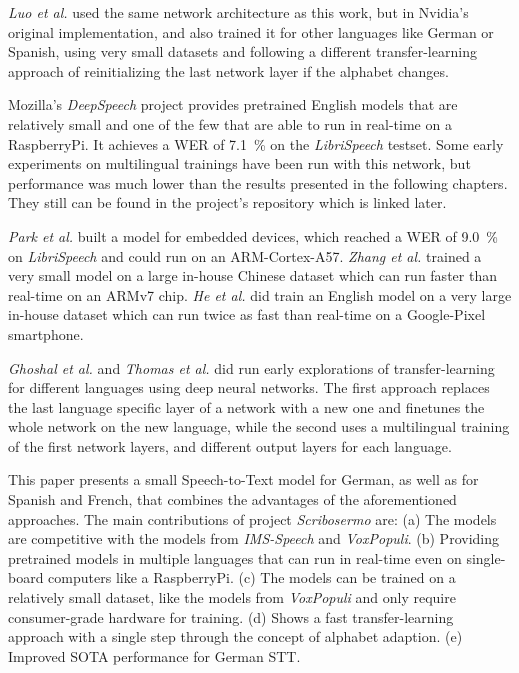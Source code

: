 \documentclass[a4paper]{article}
\begin{document}
\textit{Luo et al.} \cite{QNTECR} used the same network architecture as this work, but in Nvidia's original implementation, and also trained it for other languages like German or Spanish, using very small datasets and following a different transfer-learning approach of reinitializing the last network layer if the alphabet changes. 

Mozilla's \textit{DeepSpeech} project \cite{DEPSPE} provides pretrained English models that are relatively small and one of the few that are able to run in real-time on a RaspberryPi. It achieves a WER of \SI{7.1}{\percent} on the \textit{LibriSpeech} \cite{LIBSPE} testset. Some early experiments on multilingual trainings have been run with this network, but performance was much lower than the results presented in the following chapters. They still can be found in the project's repository which is linked later.

\textit{Park et al.} \cite{FNNMED} built a model for embedded devices, which reached a WER of \SI{9.0}{\percent} on \textit{LibriSpeech} and could run on an ARM-Cortex-A57. \textit{Zhang et al.} \cite{TINTRA} trained a very small model on a large in-house Chinese dataset which can run faster than real-time on an ARMv7 chip. \textit{He et al.} \cite{STRSRM} did train an English model on a very large in-house dataset which can run twice as fast than real-time on a Google-Pixel smartphone.

\textit{Ghoshal et al.} \cite{MLDNN} and \textit{Thomas et al.} \cite{MLFDNN} did run early explorations of transfer-learning for different languages using deep neural networks. The first approach replaces the last language specific layer of a network with a new one and finetunes the whole network on the new language, while the second uses a multilingual training of the first network layers, and different output layers for each language.

\vspace{9pt}
This paper presents a small Speech-to-Text model for German, as well as for Spanish and French, that combines the advantages of the aforementioned approaches. The main contributions of project \textit{Scribosermo} are:
(a) The models are competitive with the models from \textit{IMS-Speech} and \textit{VoxPopuli}.
(b) Providing pretrained models in multiple languages that can run in real-time even on single-board computers like a RaspberryPi.
(c) The models can be trained on a relatively small dataset, like the models from \textit{VoxPopuli} and only require consumer-grade hardware for training.
(d) Shows a fast transfer-learning approach with a single step through the concept of alphabet adaption.
(e) Improved SOTA performance for German STT.
\end{document}
